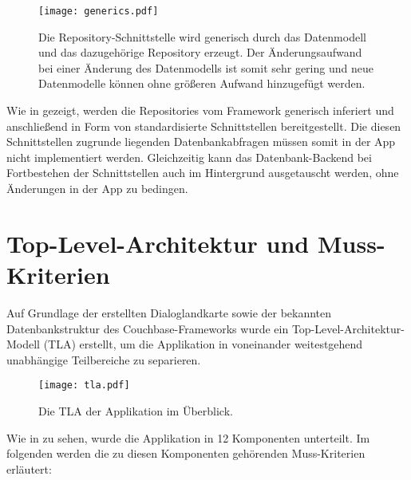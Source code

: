 \begin{figure}[H]
\texttt{[image: generics.pdf]}
\caption{Die Repository-Schnittstelle wird generisch durch das Datenmodell und das dazugehörige Repository erzeugt. Der Änderungsaufwand bei einer Änderung des Datenmodells ist somit sehr gering und neue Datenmodelle können ohne größeren Aufwand hinzugefügt werden.}\label{fig:generics}
\end{figure}

\noindent Wie in  gezeigt, werden die Repositories vom Framework generisch inferiert und anschließend in Form von standardisierte Schnittstellen bereitgestellt. Die diesen Schnittstellen zugrunde liegenden Datenbankabfragen müssen somit in der App nicht implementiert werden. Gleichzeitig kann das Datenbank-Backend bei Fortbestehen der Schnittstellen auch im Hintergrund ausgetauscht werden, ohne Änderungen in der App zu bedingen.

\section{Top-Level-Architektur und Muss-Kriterien}

Auf Grundlage der erstellten Dialoglandkarte sowie der bekannten Datenbankstruktur des Couchbase-Frameworks wurde ein Top-Level-Architektur-Modell (TLA) erstellt, um die Applikation in voneinander weitestgehend unabhängige Teilbereiche zu separieren.

\begin{figure}[H]
\texttt{[image: tla.pdf]}
\caption{Die TLA der Applikation im Überblick.}\label{fig:tla}
\end{figure}

\noindent Wie in  zu sehen, wurde die Applikation in 12 Komponenten unterteilt. Im folgenden werden die zu diesen Komponenten gehörenden Muss-Kriterien erläutert:

